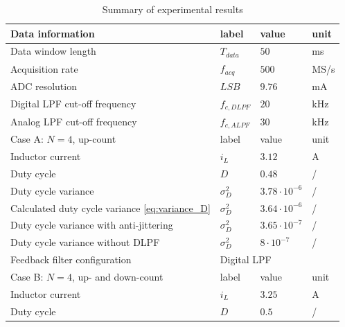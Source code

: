 \documentclass[journal]{IEEEtran}
\begin{document}
\begin{table}[h!]
			  \caption{Summary of experimental results}
              \label{tab: Experimentals}
              \centering
              \begin{tabular}{llll}
				  \midrule\midrule
        		  Data information   								& label 					& value 			& unit 	\\
        		  \midrule
                  Data window length   									& $T_{data}$   				& $50$    			& ms	\\ 
                  Acquisition rate    									& $f_{acq}$      			& $500$    			& MS/s 	\\
                  ADC resolution										& $LSB$						& $9.76$			& mA	\\
                  Digital LPF cut-off frequency							& $f_{c,DLPF}$			& $20$				& kHz 	\\
                  Analog LPF cut-off frequency							& $f_{c,ALPF}$			& $30$				& kHz 	\\                
                  \midrule\midrule
        		  Case A: $N = 4$, up-count   											& label 					& value 			& unit \\
        		  \midrule
                  Inductor current   									& $i_{L}$      				& $3.12$    			& A\\ 
                  Duty cycle    										& $D$      					& $0.48$    		& /\\
                  Duty cycle variance   								& $\sigma ^2 _D $    		& $3.78 \cdot 10^{-6}$   & /\\
				  Calculated duty cycle variance \eqref{eq:variance_D}	& $\sigma ^2 _D$      		& $3.64 \cdot 10^{-6}$   & /\\                  
				  Duty cycle variance with anti-jittering    			& $\sigma ^2 _D$      		& $3.65 \cdot 10^{-7}$    & /\\
                  Duty cycle variance without DLPF    					& $\sigma ^2 _D$      		& $8 \cdot 10^{-7}$    & /\\
                  Feedback filter configuration							& \multicolumn{3}{l}{Digital LPF}\\
                  \midrule\midrule
        		  Case B: $N = 4$, up- and down-count   											& label 					& value 			& unit \\
        		  \midrule
                  Inductor current   									& $i_{L}$      				& $3.25$    			& A\\ 
                  Duty cycle    										& $D$      					& $0.5$    		& /\\

\end{tabular}
\end{table}
\end{document}
